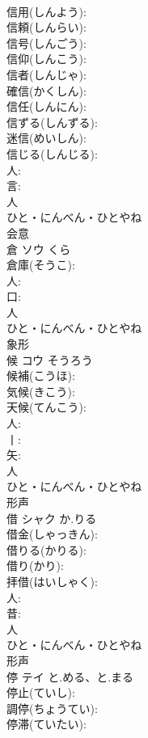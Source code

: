 \documentclass[8pt]{extreport}
\begin{document}
\begin{CJK}{UTF8}{min}
\\	信用(しんよう): 
\\	信頼(しんらい): 
\\	信号(しんごう): 
\\	信仰(しんこう): 
\\	信者(しんじゃ): 
\\	確信(かくしん): 
\\	信任(しんにん): 
\\	信ずる(しんずる): 
\\	迷信(めいしん): 
\\	信じる(しんじる): 
\\	人: 
\\	言: 
\\	人	
\\	ひと・にんべん・ひとやね	
\\	会意 
\\	倉	ソウ	くら		
\\	倉庫(そうこ): 
\\	人: 
\\	口: 
\\	人	
\\	ひと・にんべん・ひとやね	
\\	象形 
\\	候	コウ	そうろう		
\\	候補(こうほ): 
\\	気候(きこう): 
\\	天候(てんこう): 
\\	人: 
\\	丨: 
\\	矢: 
\\	人	
\\	ひと・にんべん・ひとやね	
\\	形声 
\\	借	シャク	か.りる		
\\	借金(しゃっきん): 
\\	借りる(かりる): 
\\	借り(かり): 
\\	拝借(はいしゃく): 
\\	人: 
\\	昔: 
\\	人	
\\	ひと・にんべん・ひとやね	
\\	形声 
\\	停	テイ	と.める、と.まる		
\\	停止(ていし): 
\\	調停(ちょうてい): 
\\	停滞(ていたい): 

\end{CJK}
\end{document}
